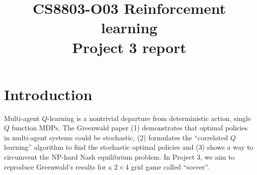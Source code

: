\documentclass[conference]{IEEEtran}
\begin{document}
\title{CS8803-O03 Reinforcement learning\\Project 3 report}

\author{
}
\maketitle


\IEEEpeerreviewmaketitle
\section{Introduction}
Multi-agent $Q$-learning is a nontrivial departure from deterministic action, single $Q$ function MDPs. The Greenwald paper \cite{greenwald} (1) demonstrates that optimal policies in multi-agent systems could be stochastic, (2) formulates the ``correlated $Q$ learning'' algorithm to find the stochastic optimal policies and (3) shows a way to circumvent the NP-hard Nash equilibrium problem. In Project 3, we aim to reproduce Greenwald's results for a $2\times4$ grid game called ``soccer''.
\end{document}
